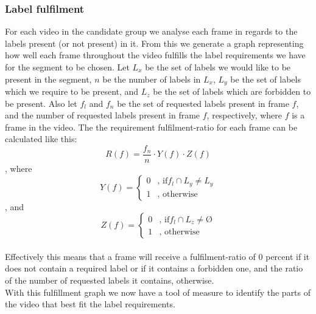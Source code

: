\subsubsection{Label fulfilment}
%
For each video in the candidate group we analyse each frame in regards to the labels present (or not present) in it. From this we generate a graph representing how well each frame throughout the video fulfills the label requirements we have for the segment to be chosen. Let $L_{x}$ be the set of labels we would like to be present in the segment, $n$ be the number of labels in $L_{x}$, $L_{y}$ be the set of labels which we require to be present, and $L_{z}$ be the set of labels which are forbidden to be present. Also let $f_{l}$ and $f_{n}$ be the set of requested labels present in frame $f$, and the number of requested labels present in frame $f$, respectively, where $f$ is a frame in the video. The the requirement fulfilment-ratio for each frame can be calculated like this:\\
%
\begin{equation}
R(f) = \frac{f_{n}}{n} \cdot Y(f) \cdot Z(f)
\end{equation} 
%
, where\\
%
\begin{equation}
Y(f) =
\begin{cases}
0 & \text{, if} f_{l} \cap L_{y} \neq L_{y}\\
1 &  \text{, otherwise}
\end{cases}
\end{equation} 
%
, and\\
%
\begin{equation}
Z(f) =
\begin{cases}
0 & \text{, if} f_{l} \cap L_{z} \neq Ø\\
1 &  \text{, otherwise}
\end{cases}
\end{equation} 
%
\\
%
Effectively this means that a frame will receive a fulfilment-ratio of 0 percent if it does not contain a required label or if it contains a forbidden one, and the ratio of the number of requested labels it contains, otherwise.\\
%
With this fulfillment graph we now have a tool of measure to identify the parts of the video that best fit the label requirements.
%
